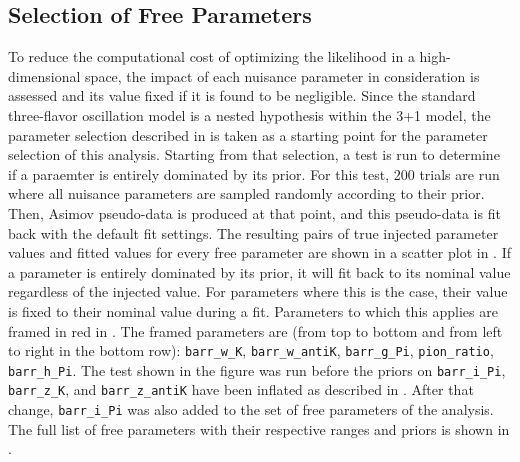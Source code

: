 \subsection{Selection of Free Parameters}
\label{sec:sterile-analysis-parameter-selection}
To reduce the computational cost of optimizing the likelihood in a high-dimensional space, the impact of each nuisance parameter in consideration is assessed and its value fixed if it is found to be negligible. Since the standard three-flavor oscillation model is a nested hypothesis within the 3+1 model, the parameter selection described in  is taken as a starting point for the parameter selection of this analysis.
Starting from that selection, a test is run to determine if a paraemter is entirely dominated by its prior. For this test, 200 trials are run where all nuisance parameters are sampled randomly according to their prior. Then,  Asimov pseudo-data is produced at that point, and this pseudo-data is fit back with the default fit settings. The resulting pairs of true injected parameter values and fitted values for every free parameter are shown in a scatter plot in . If a parameter is entirely dominated by its prior, it will fit back to its nominal value regardless of the injected value. For parameters where this is the case, their value is fixed to their nominal value during a fit. Parameters to which this applies are framed in red in . The framed parameters are (from top to bottom and from left to right in the bottom row): \texttt{barr\_w\_K}, \texttt{barr\_w\_antiK}, \texttt{barr\_g\_Pi}, \texttt{pion\_ratio}, \texttt{barr\_h\_Pi}. The test shown in the figure was run before the priors on \texttt{barr\_i\_Pi}, \texttt{barr\_z\_K}, and \texttt{barr\_z\_antiK} have been inflated as described in . After that change,  \texttt{barr\_i\_Pi} was also added to the set of free parameters of the analysis. The full list of free parameters with their respective ranges and priors is shown in .

